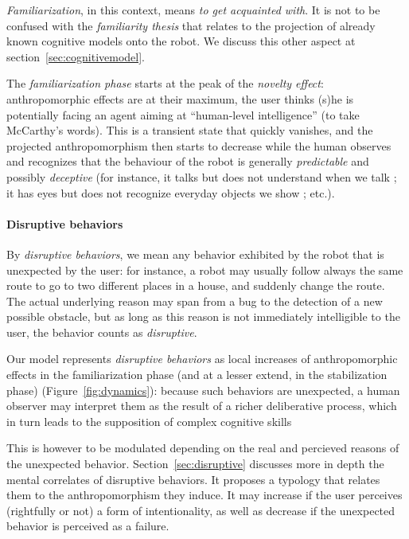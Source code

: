 \documentclass{frontiersSCNS} %
\begin{document}
\emph{Familiarization}, in this context, means \emph{to get acquainted with}.
It is not to be confused with the \emph{familiarity thesis} that relates to the
projection of already known cognitive models onto the robot. We discuss this other
aspect at section~\ref{sec:cognitivemodel}.

The \emph{familiarization phase} starts at the peak of the \emph{novelty
effect}: anthropomorphic effects are at their maximum, the user thinks (s)he is
potentially facing an agent aiming at ``human-level intelligence'' (to take
McCarthy's words). This is a transient state that quickly vanishes, and the
projected anthropomorphism then starts to decrease while the human observes and
recognizes that the behaviour of the robot is generally \emph{predictable} and
possibly \emph{deceptive} (for instance, it talks but does not understand when
we talk ; it has eyes but does not recognize everyday objects we show ; etc.).

\paragraph{Disruptive behaviors}

By \emph{disruptive behaviors}, we mean any behavior exhibited by the robot
that is unexpected by the user: for instance, a robot may usually follow always
the same route to go to two different places in a house, and suddenly change
the route. The actual underlying reason may span from a bug to the detection of
a new possible obstacle, but as long as this reason is not immediately
intelligible to the user, the behavior counts as \emph{disruptive}.

Our model represents \emph{disruptive behaviors} as local increases of
anthropomorphic effects in the familiarization phase (and at a lesser extend,
in the stabilization phase) (Figure~\ref{fig:dynamics}): because such behaviors
are unexpected, a human observer may interpret them as the result of a richer
deliberative process, which in turn leads to the supposition of complex
cognitive skills

This is however to be modulated depending on the real and percieved reasons of the
unexpected behavior.  Section~\ref{sec:disruptive} discusses more in depth the
mental correlates of disruptive behaviors. It proposes a typology that relates
them to the anthropomorphism they induce. It may increase if the user perceives
(rightfully or not) a form of intentionality, as well as decrease if the
unexpected behavior is perceived as a failure.
\end{document}
